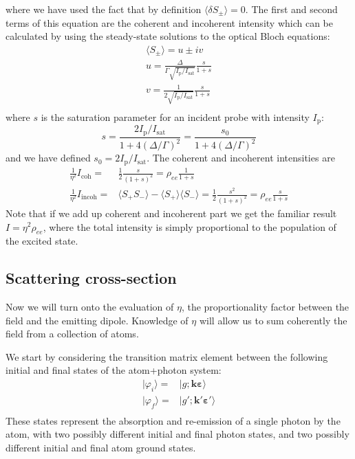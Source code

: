 \documentclass[11pt,letter]{article}
\newcommand{\bv}[1]{\ensuremath{\bm{#1}}}
\newcommand{\iisat}{\ensuremath{I_{\mathrm{p}}/I_{\mathrm{sat}}}}
\begin{document}
where we have used the fact that by definition $\langle \delta S_{\pm}
\rangle = 0$. The first and second terms of this equation are the coherent
and incoherent intensity which can be calculated by using the
steady-state solutions to the optical Bloch equations:
\begin{gather} 
    \langle S_{\pm} \rangle =  u \pm i v  \\
    u =  \frac{ \Delta }{ \Gamma  \sqrt{ I_{\mathrm{p}} / I_{\mathrm{sat}}} } 
         \frac{s}{ 1 + s } \\
    v =  \frac{ 1 } { 2 \sqrt{ I_{\mathrm{p}} / I_{\mathrm{sat}}} } 
         \frac{s}{1+s} \\
\end{gather}
where $s$ is the saturation parameter for an incident probe with intensity
$I_{\mathrm{p}}$:
\begin{equation}
s = \frac{ 2  \iisat } { 1 + 4(\Delta/\Gamma)^{2} } 
  =  \frac{ s_{0} } { 1 + 4(\Delta/\Gamma)^{2} }
\end{equation}
and we have defined $s_{0} = 2 \iisat$. 
The coherent and incoherent intensities are
\begin{equation}
\begin{split} 
    \frac{1}{\eta^{2}}  I_{\mathrm{coh}} = &
        \frac{1}{2} \frac{s}{(1+s)^{2} } 
      = \rho_{ee}  \frac{1}{1+s} \\
    \frac{1}{\eta^{2}}  I_{\mathrm{incoh}}  = & 
        \langle S_{+}S_{-} \rangle - \langle S_{+} \rangle \langle S_{-} \rangle
      = \frac{1}{2} \frac{s^{2}}{(1+s)^{2}} = \rho_{ee} \frac{s}{1+s}
 \label{eq:coh-incoh} 
\end{split}
\end{equation}
Note that if we add up coherent and incoherent part we get the familiar result
$I=\eta^{2} \rho_{ee}$, where the total intensity is simply proportional to the
population of the excited state.


\subsection{Scattering cross-section}

Now we will turn onto the evaluation of $\eta$, the proportionality factor
between the field and the emitting dipole.  Knowledge of $\eta$ will allow us
to sum coherently the field from a collection of atoms. 

We start by considering the  transition matrix element between the following
initial and final states of the atom+photon system: 
\begin{equation}
\begin{split}
    | \varphi_{i} \rangle = & | g ; \bv{k}\bv{\varepsilon} \rangle \\
    | \varphi_{f} \rangle = & | g' ; \bv{k}'\bv{\varepsilon}' \rangle \\
\end{split}
\end{equation}
These states represent the absorption and re-emission of a single photon by the
atom, with two possibly different initial and final photon states, and two
possibly different initial and final atom ground states.
 
\end{document}
